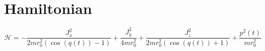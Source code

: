 \documentclass{article}%
\begin{document}
%
\normalsize%
\section*{Hamiltonian}%
\begin{dmath}%
\mathcal{H} = - \frac{J_{x}^{2}}{2 m r_{0}^{2} \left(\cos{\left (q{\left (t \right )} \right )} - 1\right)} + \frac{J_{y}^{2}}{4 m r_{0}^{2}} + \frac{J_{z}^{2}}{2 m r_{0}^{2} \left(\cos{\left (q{\left (t \right )} \right )} + 1\right)} + \frac{p^{2}{\left (t \right )}}{m r_{0}^{2}}%
\end{dmath}

%
\end{document}
